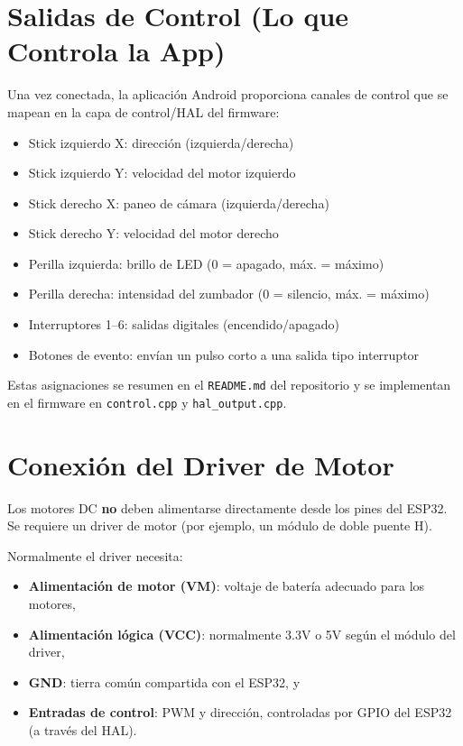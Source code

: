 \section{Salidas de Control (Lo que Controla la App)}
\label{sec:hw-control-outputs}

Una vez conectada, la aplicación Android proporciona canales de control que se mapean en la capa de control/HAL del firmware:
\begin{itemize}
    \item Stick izquierdo X: dirección (izquierda/derecha)
    \item Stick izquierdo Y: velocidad del motor izquierdo
    \item Stick derecho X: paneo de cámara (izquierda/derecha)
    \item Stick derecho Y: velocidad del motor derecho
    \item Perilla izquierda: brillo de LED (0 = apagado, máx. = máximo)
    \item Perilla derecha: intensidad del zumbador (0 = silencio, máx. = máximo)
    \item Interruptores 1--6: salidas digitales (encendido/apagado)
    \item Botones de evento: envían un pulso corto a una salida tipo interruptor
\end{itemize}

Estas asignaciones se resumen en el \texttt{README.md} del repositorio y se implementan en el firmware en
\texttt{control.cpp} y \texttt{hal\_output.cpp}.

\section{Conexión del Driver de Motor}
\label{sec:hw-motor-driver}

Los motores DC \textbf{no} deben alimentarse directamente desde los pines del ESP32. Se requiere un driver de motor
(por ejemplo, un módulo de doble puente H).

Normalmente el driver necesita:
\begin{itemize}
    \item \textbf{Alimentación de motor (VM)}: voltaje de batería adecuado para los motores,
    \item \textbf{Alimentación lógica (VCC)}: normalmente 3.3V o 5V según el módulo del driver,
    \item \textbf{GND}: tierra común compartida con el ESP32, y
    \item \textbf{Entradas de control}: PWM y dirección, controladas por GPIO del ESP32 (a través del HAL).
\end{itemize}

